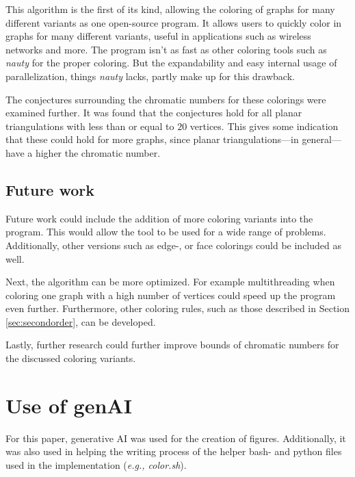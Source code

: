 \documentclass{article}
\begin{document}
This algorithm is the first of its kind, allowing the coloring of graphs for many different variants as one open-source program. It allows users to quickly color in graphs for many different variants, useful in applications such as wireless networks and more.
The program isn't as fast as other coloring tools such as \textit{nauty} for the proper coloring. But the expandability and easy internal usage of parallelization, things \textit{nauty} lacks, partly make up for this drawback. 

The conjectures surrounding the chromatic numbers for these colorings were examined further. It was found that the conjectures hold for all planar triangulations with less than or equal to $20$ vertices. This gives some indication that these could hold for more graphs, since planar triangulations---in general---have a higher the chromatic number. 


\subsection{Future work}

Future work could include the addition of more coloring variants into the program. This would allow the tool to be used for a wide range of problems. 
Additionally, other versions such as edge-, or face colorings could be included as well.

Next, the algorithm can be more optimized. For example multithreading when coloring one graph with a high number of vertices could speed up the program even further. Furthermore, other coloring rules, such as those described in Section \ref{sec:secondorder}, can be developed.

Lastly, further research could further improve bounds of chromatic numbers for the discussed coloring variants. 


\section*{Use of genAI}

For this paper, generative AI was used for the creation of figures. Additionally, it was also used in helping the writing process of the helper bash- and python files used in the implementation (\textit{e.g., color.sh}).



%

%

	
	
\end{document}
